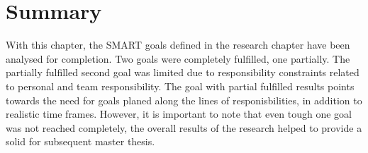 





\section{Summary}
With this chapter, the SMART goals defined in the research chapter have been analysed for completion. Two goals were completely fulfilled, one partially. The partially fulfilled second goal was limited due to responsibility constraints related to personal and team responsibility. The goal with partial fulfilled results points towards the need for goals planed along the lines of responisbilities, in addition to realistic time frames. However, it is important to note that even tough one goal was not reached completely, the overall results of the research helped to provide a solid for subsequent master thesis.


